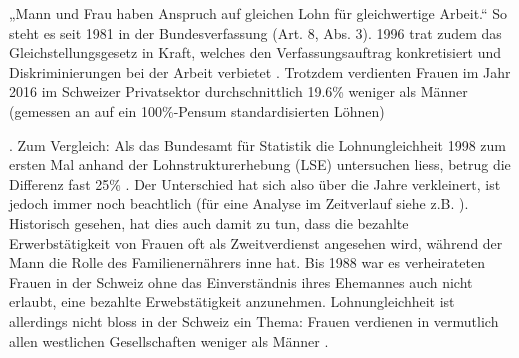 \documentclass[a4paper,12pt]{article}
\renewcommand{\baselinestretch}{1.1}
\newif\ifcomments
\newcommand{\comment}[1]{%
    \ifcomments\marginpar{\renewcommand{\baselinestretch}{1}\tiny\hspace*{-1.1em}\colorbox{gray!20}%
    {\textcolor{red}{\parbox[t]{.9in}{\raggedright #1}}}}\fi}
\begin{document}
\comment{Hinweis auf Heiratsrecht bis 1988: “Note that this arrangement was enshrined 
in Switzerland’s marriage law until 1988, giving husbands the status as legal 
head of family from whom wives needed the consent in order to take on paid employment.” 
(Paper von Benita und Oli Oesch im ESR; das paper sollte irgendwo zitiert werden) -> ok}

\comment{cite „Oesch:2017“ somewhere; see bibtex file}

\comment{OK, beide Artikel zitiert.}

 „Mann und Frau haben Anspruch auf gleichen Lohn für gleichwertige Arbeit.“ So steht es seit 1981 in der Bundesverfassung (Art. 8, Abs. 3). 1996 trat zudem das Gleichstellungsgesetz in Kraft, welches den Verfassungsauftrag konkretisiert und Diskriminierungen bei der Arbeit verbietet  \citep{EDI-2019}. Trotzdem verdienten Frauen im Jahr 2016 im Schweizer Privatsektor durchschnittlich 19.6\% weniger als Männer
(gemessen an auf ein 100\%-Pensum standardisierten Löhnen) \comment{Zahlen aktualisieren? -> Zahlen aktualisiert.}
\citep{BFS-2019a}. Zum Vergleich: Als das Bundesamt für Statistik die
Lohnungleichheit 1998 zum ersten Mal anhand der Lohnstrukturerhebung (LSE)
untersuchen liess, betrug die Differenz fast 25\% \citep{Strub-etal-2006}. Der
Unterschied hat sich also über die Jahre verkleinert, ist jedoch immer noch
beachtlich (für eine Analyse im Zeitverlauf siehe z.B. \citealp{Schmid-2016}). Historisch gesehen, hat dies auch damit zu tun, dass die bezahlte Erwerbstätigkeit von Frauen oft als Zweitverdienst angesehen wird, während der Mann die Rolle des Familienernährers inne hat. Bis 1988 war es verheirateten Frauen in der Schweiz ohne das Einverständnis ihres Ehemannes auch nicht erlaubt, eine bezahlte Erwebstätigkeit anzunehmen\citep{Combet-2019}. Lohnungleichheit ist allerdings nicht bloss in der Schweiz ein Thema: Frauen verdienen in vermutlich allen westlichen Gesellschaften weniger als Männer \citep{Blau-2016}.
\end{document}
